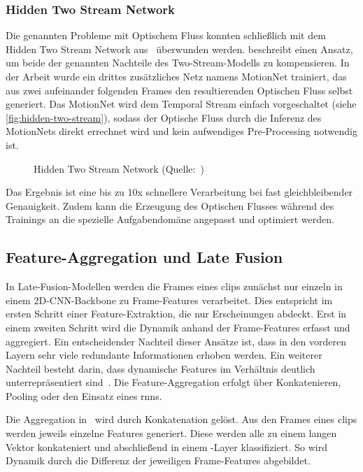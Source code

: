 \subsubsection{Hidden Two Stream Network}

Die genannten Probleme mit Optischem Fluss konnten schließlich mit dem Hidden Two Stream Network aus~\cite{Zhu17} überwunden werden.
\cite{Zhu17} beschreibt einen Ansatz, um beide der genannten Nachteile des Two-Stream-Modells zu kompensieren.
In der Arbeit wurde ein drittes zusätzliches Netz namens MotionNet trainiert, das aus zwei aufeinander folgenden Frames den resultierenden Optischen Fluss selbst generiert.
Das MotionNet wird dem Temporal Stream einfach vorgeschaltet (siehe \autoref{fig:hidden-two-stream}), sodass der Optische Fluss durch die Inferenz des MotionNets direkt errechnet wird und kein aufwendiges Pre-Processing notwendig ist.

\begin{figure}[h!]
    \centering
    \caption{Hidden Two Stream Network (Quelle:~\cite{Zhu17})}
    \label{fig:hidden-two-stream}
\end{figure}

Das Ergebnis ist eine bis zu 10x schnellere Verarbeitung bei fast gleichbleibender Genauigkeit.
Zudem kann die Erzeugung des Optischen Flusses während des Trainings an die spezielle Aufgabendomäne angepasst und optimiert werden.

\subsection{Feature-Aggregation und Late Fusion}
\label{subsec:late-fusion}

In Late-Fusion-Modellen werden die Frames eines \glspl{clip} zunächst nur einzeln in einem 2D-CNN-Backbone zu Frame-Features verarbeitet.
Dies entspricht im ersten Schritt einer Feature-Extraktion, die nur Erscheinungen abdeckt.
Erst in einem zweiten Schritt wird die Dynamik anhand der Frame-Features erfasst und aggregiert.
Ein entscheidender Nachteil dieser Ansätze ist, dass in den vorderen Layern sehr viele redundante Informationen erhoben werden.
Ein weiterer Nachteil besteht darin, dass dynamische Features im Verhältnis deutlich unterrepräsentiert sind~\cite{Karpathy14}.
Die Feature-Aggregation erfolgt über Konkatenieren, Pooling oder den Einsatz eines \glspl{rnn}.

Die Aggregation in~\cite{Karpathy14} wird durch Konkatenation gelöst.
Aus den Frames eines \glspl{clip} werden jeweils einzelne Features generiert.
Diese werden alle zu einem langen Vektor konkateniert und abschließend in einem \fc-Layer klassifiziert.
So wird Dynamik durch die Differenz der jeweiligen Frame-Features abgebildet.

